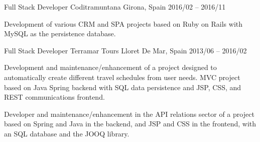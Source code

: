 \documentclass[]{awesome-cv}
\begin{document}
\begin{cventries}
	\cventry
	{Full Stack Developer}
	{Coditramuntana}
	{Girona, Spain}
	{2016/02 – 2016/11}
	{\begin{cvitems}
		\vspace{0.5mm}
		\item {Development of various CRM and SPA projects based on Ruby on Rails with MySQL as the persistence database.}
		\end{cvitems}}


	\cventry
	{Full Stack Developer}
	{Terramar Tours}
	{Lloret De Mar, Spain}
	{2013/06 – 2016/02}
	{\begin{cvitems}
		\vspace{0.5mm}
		\item {Development and maintenance/enhancement of a project designed to automatically create different travel schedules from user needs. MVC project based on Java Spring backend with SQL data persistence and JSP, CSS, and REST communications frontend.}
  \item {Developer and maintenance/enhancement in the API relations sector of a project based on Spring and Java in the backend, and JSP and CSS in the frontend, with an SQL database and the JOOQ library.}
		\end{cvitems}}
\end{cventries}
\end{document}
